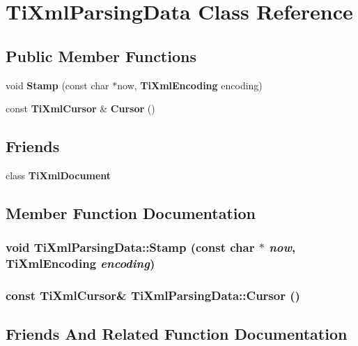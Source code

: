 \section{TiXmlParsingData Class Reference}
\label{classTiXmlParsingData}
\subsection*{Public Member Functions}
\begin{CompactItemize}
\item 
void {\bf Stamp} (const char $\ast$now, {\bf TiXmlEncoding} encoding)
\item 
const {\bf TiXmlCursor} \& {\bf Cursor} ()
\end{CompactItemize}
\subsection*{Friends}
\begin{CompactItemize}
\item 
class {\bf TiXmlDocument}
\end{CompactItemize}


\subsection{Member Function Documentation}
\subsubsection{\setlength{\rightskip}{0pt plus 5cm}void TiXmlParsingData::Stamp (const char $\ast$ {\em now}, {\bf TiXmlEncoding} {\em encoding})}\label{classTiXmlParsingData_65cee8ab77a36c605db08c84b4c30a7d}


\subsubsection{\setlength{\rightskip}{0pt plus 5cm}const {\bf TiXmlCursor}\& TiXmlParsingData::Cursor ()\hspace{0.3cm}{\tt  [inline]}}\label{classTiXmlParsingData_56908a17d7d7a6b2e511e62cf1d40d05}




\subsection{Friends And Related Function Documentation}
